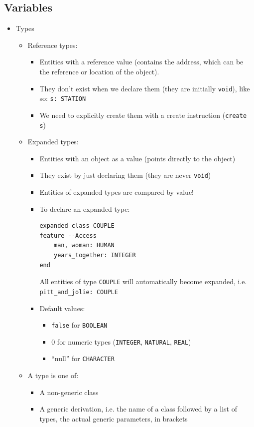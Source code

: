 \documentclass[a4paper]{article}
\newcommand{\inline}[1]{\lstinline!#1!}%
\begin{document}
\subsection{Variables}
\begin{itemize}
\item Types
\begin{itemize}
\item Reference types: 
\begin{itemize}
\item Entities with a reference value (contains the address, which can be the reference or location of the object).
\item They don't exist when we declare them (they are initially \inline{void}), like so: \inline{s: STATION}
\item We need to explicitly create them with a create instruction (\inline{create s})
\end{itemize}
\item Expanded types:
\begin{itemize}
\item Entities with an object as a value (points directly to the object)
\item They exist by just declaring them (they are never \inline{void})
\item Entities of expanded types are compared by value!
\item To declare an expanded type:
\begin{lstlisting}
expanded class COUPLE
feature --Access
	man, woman: HUMAN
	years_together: INTEGER
end
\end{lstlisting}
All entities of type \inline{COUPLE} will automatically become expanded, i.e. \inline{pitt_and_jolie: COUPLE}
\item Default values:
\begin{itemize}
\item \inline{false} for \inline{BOOLEAN}
\item 0 for numeric types (\inline{INTEGER}, \inline{NATURAL}, \inline{REAL})
\item ``null'' for \inline{CHARACTER}
\end{itemize}
\end{itemize}
\item A type is one of:
\begin{itemize}
\item A non-generic class
\item A generic derivation, i.e. the name of a class followed by a list of types, the actual generic parameters, in brackets

\end{itemize}
\end{itemize}
\end{itemize}
\end{document}
